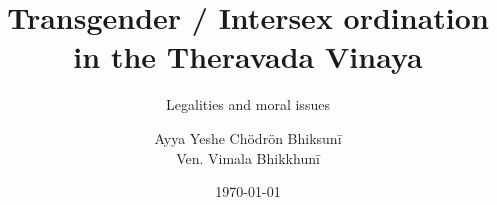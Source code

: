 \clearpage
\thispagestyle{empty}
\titlehead{}
\title{Transgender / Intersex ordination in the Theravada Vinaya}
\subtitle{Legalities and moral issues}
\author{Ayya Yeshe Chödrön Bhiksunī\\Ven. Vimala Bhikkhunī}
\date{\today}
\maketitle

